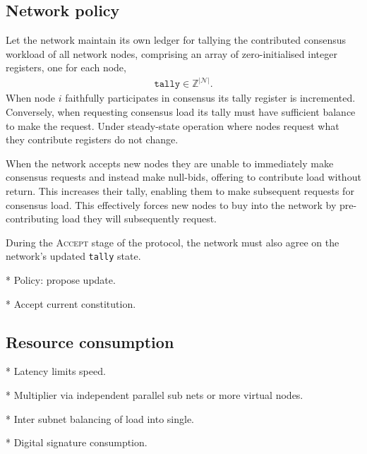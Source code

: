 \subsection{Network policy}

Let the network maintain its own ledger for tallying the contributed consensus workload of all network nodes, comprising an array of zero-initialised integer registers, one for each node,
\begin{align}
	\mathtt{tally}\in\mathbb{Z}^{|\mathcal{N}|}.
\end{align}
When node $i$ faithfully participates in consensus its tally register is incremented. Conversely, when requesting consensus load its tally must have sufficient balance to make the request. Under steady-state operation where nodes request what they contribute registers do not change.

When the network accepts new nodes they are unable to immediately make consensus requests and instead make null-bids, offering to contribute load without return. This increases their tally, enabling them to make subsequent requests for consensus load. This effectively forces new nodes to buy into the network by pre-contributing load they will subsequently request.

During the \textsc{Accept} stage of the protocol, the network must also agree on the network's updated \texttt{tally} state.

* Policy: propose update.

* Accept current constitution.



\subsection{Resource consumption}

* Latency limits speed.

* Multiplier via independent parallel sub nets or more virtual nodes.

* Inter subnet balancing of load into single.

* Digital signature consumption.